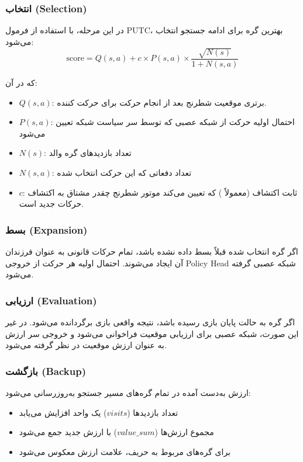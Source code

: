 \documentclass[12pt,a4paper]{article}
\begin{document}
	\subsubsection{انتخاب (Selection)}
	در این مرحله، با استفاده از فرمول PUTC، بهترین گره برای ادامه جستجو انتخاب می‌شود:
	\[
	\text{score} = Q(s,a) + c \times P(s,a) \times \frac{\sqrt{N(s)}}{1 + N(s,a)}
	\]
	
	که در آن:
	\begin{itemize}
		\item \(Q(s,a)\): برتری موقعیت شطرنج بعد از انجام حرکت 
        برای حرکت کننده.
		\item \(P(s,a)\): احتمال اولیه حرکت از شبکه عصبی که توسط سر سیاست شبکه تعیین می‌شود
		\item \(N(s)\): تعداد بازدیدهای گره والد
		\item \(N(s,a)\): تعداد دفعاتی که این حرکت انتخاب شده
		\item \(c\): ثابت اکتشاف (معمولاً ) 
        که تعیین می‌کند موتور شطرنج چقدر مشتاق به اکتشاف حرکات جدید است.
	\end{itemize}
	
	\subsubsection{بسط (Expansion)}
	اگر گره انتخاب شده قبلاً بسط داده نشده باشد، تمام حرکات قانونی به عنوان فرزندان آن ایجاد می‌شوند. احتمال اولیه هر حرکت از خروجی Policy Head شبکه عصبی گرفته می‌شود.
	
	\subsubsection{ارزیابی (Evaluation)}
	اگر گره به حالت پایان بازی رسیده باشد، نتیجه واقعی بازی برگردانده می‌شود. در غیر این صورت، شبکه عصبی برای ارزیابی موقعیت فراخوانی می‌شود و خروجی سر ارزش به عنوان ارزش موقعیت در نظر گرفته می‌شود.
	
	\subsubsection{بازگشت (Backup)}
	ارزش به‌دست آمده در تمام گره‌های مسیر جستجو به‌روزرسانی می‌شود:
	\begin{itemize}
		\item تعداد بازدیدها (\(visits\)) یک واحد افزایش می‌یابد
		\item مجموع ارزش‌ها (\(value\_sum\)) با ارزش جدید جمع می‌شود
		\item برای گره‌های مربوط به حریف، علامت ارزش معکوس می‌شود
	\end{itemize}
	
\end{document}
